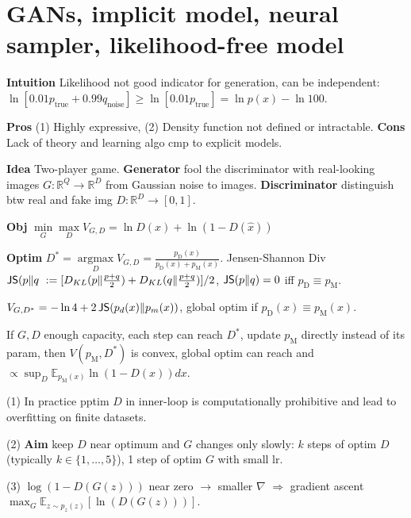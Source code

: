 \section{GANs, implicit model, neural sampler, likelihood-free model}

\textbf{Intuition} Likelihood not good indicator for generation, can be independent: \(\ln [0.01 p_{\text{true}}+0.99 q_{\text{noise}}] \geq \ln [0.01 p_{\text{true}}]=\ln p({x})-\ln 100\).

\textbf{Pros} (1) Highly expressive, (2) Density function not defined or intractable.
 \textbf{Cons} Lack of theory and learning algo cmp to explicit models.


\textbf{Idea} Two-player game. \textbf{Generator} fool the discriminator with real-looking images \(G: \mathbb{R}^{Q} \to \mathbb{R}^{D}\) from Gaussian noise to images. \textbf{Discriminator} distinguish btw real and fake img \(D: \mathbb{R}^{D} \to [0,1]\).

\textbf{Obj} \( \underset{G}{\operatorname{min}} \underset{D}{\operatorname{max}} {V}_{{G}, {D}}=\ln D({x}) + \ln (1-D(\hat{{x}}))\)

\textbf{Optim} \(D^{*} = \underset{D}{\operatorname{argmax}} {V}_{{G}, {D}} = \frac{p_{\text{D}}({x})}{p_{\text {D}}({x})+p_{\text {M}}({x})}\). 
% 
Jensen-Shannon Div \(\operatorname{\mathsf{JS}}(p \| q\ := [ {D}_{K L}(p \| \frac{p+q}{2})+{D}_{K L}(q \| \frac{p+q}{2}) ]/2\), \(\operatorname{\mathsf{JS}}(p \| q)=0\) iff \(p_{\text {D}}\equiv p_{\text {M}}\).

\(V_{G, D^{*}} =  -\ln 4+2 \operatorname{\mathsf{JS}} (p_{d}({x}) \| p_{m}({x}))\), global optim if \(p_{\text {D}}({x})\equiv p_{\text {M}}({x})\).

If \(G,D\) enough capacity, each step can reach \(D^*\),  update \(p_{\text {M}}\) directly instead of its param, then \(V(p_{\text{M}}, D^{*})\) is convex, global optim can reach and \( \propto \sup _{D} \mathbb{E}_{p_{\text {M}}({x})} \ln (1-D({x})) d {x}\).

(1) In practice pptim \(D\) in inner-loop is computationally prohibitive and lead to overfitting on finite datasets.

(2) \textbf{Aim} keep \(D\) near optimum and \(G\) changes only slowly: \(k\) steps of optim \(D\) (typically \(k \in\{1, \ldots, 5\}\)), 1 step of optim \(G\) with small lr. 

(3) \(\log (1-D(G(z)))\) near zero \(\to\) smaller \(\nabla\) \(\Rightarrow\) gradient ascent \(\max _{G} \mathbb{E}_{z \sim p_{z}(z)}[\ln (D(G(z)))]\).


